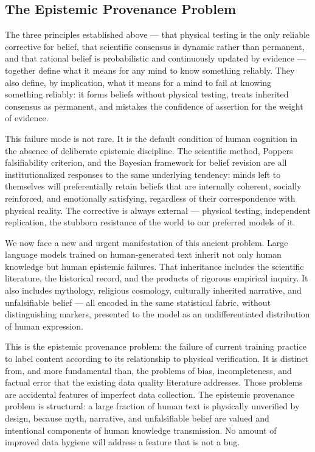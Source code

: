 \documentclass[12pt]{article}
\begin{document}
\subsection{The Epistemic Provenance Problem}\label{the-epistemic-provenance-problem}

The three principles established above --- that physical testing is the
only reliable corrective for belief, that scientific consensus is
dynamic rather than permanent, and that rational belief is probabilistic
and continuously updated by evidence --- together define what it means
for any mind to know something reliably. They also define, by
implication, what it means for a mind to fail at knowing something
reliably: it forms beliefs without physical testing, treats inherited
consensus as permanent, and mistakes the confidence of assertion for the
weight of evidence.

This failure mode is not rare. It is the default condition of human
cognition in the absence of deliberate epistemic discipline. The
scientific method, Popper\textquotesingle s falsifiability criterion,
and the Bayesian framework for belief revision are all institutionalized
responses to the same underlying tendency: minds left to themselves will
preferentially retain beliefs that are internally coherent, socially
reinforced, and emotionally satisfying, regardless of their
correspondence with physical reality. The corrective is always external
--- physical testing, independent replication, the stubborn resistance
of the world to our preferred models of it.

We now face a new and urgent manifestation of this ancient problem.
Large language models trained on human-generated text inherit not only
human knowledge but human epistemic failures. That inheritance includes
the scientific literature, the historical record, and the products of
rigorous empirical inquiry. It also includes mythology, religious
cosmology, culturally inherited narrative, and unfalsifiable belief ---
all encoded in the same statistical fabric, without distinguishing
markers, presented to the model as an undifferentiated distribution of
human expression.

This is the epistemic provenance problem: the failure of current
training practice to label content according to its relationship to
physical verification. It is distinct from, and more fundamental than,
the problems of bias, incompleteness, and factual error that the
existing data quality literature addresses. Those problems are
accidental features of imperfect data collection. The epistemic
provenance problem is structural: a large fraction of human text is
physically unverified by design, because myth, narrative, and
unfalsifiable belief are valued and intentional components of human
knowledge transmission. No amount of improved data hygiene will address
a feature that is not a bug.
\end{document}

